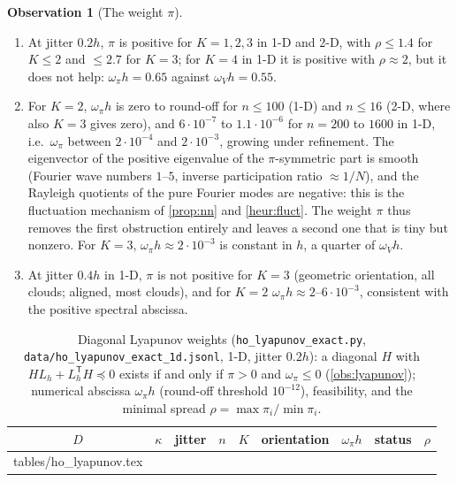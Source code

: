\documentclass[11pt,a4paper]{article}
\makeatletter
\theoremstyle{plain}
\theoremstyle{definition}
\newtheorem{observation}[theorem]{Observation}
\theoremstyle{remark}
\numberwithin{equation}{section}
\newcommand{\inputrows}[1]{\@@input #1 }%
\makeatother
\begin{document}
\begin{observation}[The weight $\pi$]\label{obs:pi}
\begin{enumerate}[label=(\roman*)]
\item At jitter $0.2h$, $\pi$ is positive for $K=1,2,3$ in 1-D and 2-D, with $\rho\le1.4$ for $K\le2$ and $\le2.7$ for $K=3$; for $K=4$ in 1-D it is positive with $\rho\approx2$, but it does not help: $\omega_\pi h=0.65$ against $\omega_Vh=0.55$.
\item For $K=2$, $\omega_\pi h$ is zero to round-off for $n\le100$ (1-D) and $n\le16$ (2-D, where also $K=3$ gives zero), and $6\cdot10^{-7}$ to $1.1\cdot10^{-6}$ for $n=200$ to $1600$ in 1-D, i.e.\ $\omega_\pi$ between $2\cdot10^{-4}$ and $2\cdot10^{-3}$, growing under refinement. The eigenvector of the positive eigenvalue of the $\pi$-symmetric part is smooth (Fourier wave numbers $1$--$5$, inverse participation ratio $\approx1/N$), and the Rayleigh quotients of the pure Fourier modes are negative: this is the fluctuation mechanism of \cref{prop:nn} and \cref{heur:fluct}. The weight $\pi$ thus removes the first obstruction entirely and leaves a second one that is tiny but nonzero. For $K=3$, $\omega_\pi h\approx2\cdot10^{-3}$ is constant in $h$, a quarter of $\omega_Vh$.
\item At jitter $0.4h$ in 1-D, $\pi$ is not positive for $K=3$ (geometric orientation, all clouds; aligned, most clouds), and for $K=2$ $\omega_\pi h\approx2$--$6\cdot10^{-3}$, consistent with the positive spectral abscissa.
\end{enumerate}
\end{observation}

\begin{table}[t]
\centering
\caption{Diagonal Lyapunov weights (\texttt{ho\_lyapunov\_exact.py}, \texttt{data/ho\_lyapunov\_exact\_1d.jsonl}, 1-D, jitter $0.2h$): a diagonal $H$ with $HL_h+L_h^{\mathsf T}H\preceq0$ exists if and only if $\pi>0$ and $\omega_\pi\le0$ (\cref{obs:lyapunov}); numerical abscissa $\omega_\pi h$ (round-off threshold $10^{-12}$), feasibility, and the minimal spread $\rho=\max\pi_i/\min\pi_i$.}\label{tab:lyapunov}
\small
\begin{tabular}{ccccccccc}
\toprule
$D$ & $\kappa$ & jitter & $n$ & $K$ & orientation & $\omega_\pi h$ & status & $\rho$\\
\midrule
\inputrows{tables/ho_lyapunov.tex}
\bottomrule
\end{tabular}
\end{table}
\end{document}
